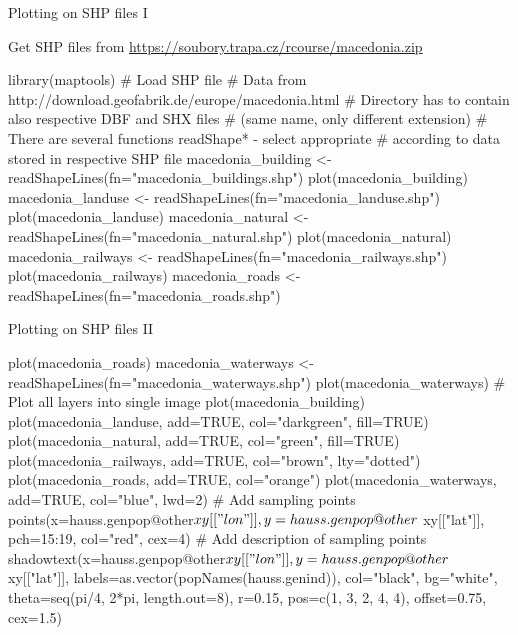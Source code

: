 \documentclass[compress, ucs, xelatex, 11pt, xcolor=svgnames,
  hyperref={
    bookmarks=true,
    unicode=true,
    colorlinks=true,
    pdftitle={Molecular data in R},
    plainpages=false,
    pdfauthor={Vojtech Zeisek},
    pdfsubject={Course about phylogeny and evolution in R},
    pdfcreator={XeLaTeX},
    pdfkeywords={R, evolution, phylogeny, molecular data},
    linkcolor=Tomato,
    anchorcolor=SaddleBrown,
    citecolor=Goldenrod,
    filecolor=DarkMagenta,
    menucolor=Sienna,
    urlcolor=DarkTurquoise,
    pdftex},
  url={hyphens, lowtilde} %
  ]{beamer}
\begin{document}
\begin{frame}[fragile]{Plotting on SHP files I}
  \vfil
  \begin{scriptsize}
    Get SHP files from \url{https://soubory.trapa.cz/rcourse/macedonia.zip}
  \end{scriptsize}
  \vfill
  \begin{spluscode}
    library(maptools)
    # Load SHP file
    # Data from http://download.geofabrik.de/europe/macedonia.html
    # Directory has to contain also respective DBF and SHX files
    # (same name, only different extension)
    # There are several functions readShape* - select appropriate
    # according to data stored in respective SHP file
    macedonia_building <- readShapeLines(fn="macedonia_buildings.shp")
    plot(macedonia_building)
    macedonia_landuse <- readShapeLines(fn="macedonia_landuse.shp")
    plot(macedonia_landuse)
    macedonia_natural <- readShapeLines(fn="macedonia_natural.shp")
    plot(macedonia_natural)
    macedonia_railways <- readShapeLines(fn="macedonia_railways.shp")
    plot(macedonia_railways)
    macedonia_roads <- readShapeLines(fn="macedonia_roads.shp")
  \end{spluscode}
  \vfil
\end{frame}

\begin{frame}[fragile]{Plotting on SHP files II}
  \begin{spluscode}
    plot(macedonia_roads)
    macedonia_waterways <- readShapeLines(fn="macedonia_waterways.shp")
    plot(macedonia_waterways)
    # Plot all layers into single image
    plot(macedonia_building)
    plot(macedonia_landuse, add=TRUE, col="darkgreen", fill=TRUE)
    plot(macedonia_natural, add=TRUE, col="green", fill=TRUE)
    plot(macedonia_railways, add=TRUE, col="brown", lty="dotted")
    plot(macedonia_roads, add=TRUE, col="orange")
    plot(macedonia_waterways, add=TRUE, col="blue", lwd=2)
    # Add sampling points
    points(x=hauss.genpop@other$xy[["lon"]], y=hauss.genpop@other$
      xy[["lat"]], pch=15:19, col="red", cex=4)
    # Add description of sampling points
    shadowtext(x=hauss.genpop@other$xy[["lon"]], y=hauss.genpop@other$
      xy[["lat"]], labels=as.vector(popNames(hauss.genind)), col="black",
      bg="white", theta=seq(pi/4, 2*pi, length.out=8), r=0.15,
      pos=c(1, 3, 2, 4, 4), offset=0.75, cex=1.5)
  \end{spluscode}
\end{frame}
\end{document}
